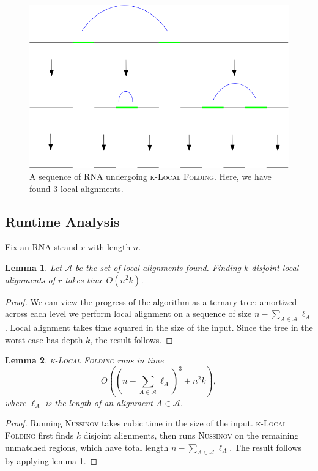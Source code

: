 \documentclass[11pt]{article}
\newcommand{\klf}{\textsc{k-Local Folding}\xspace}
\newcommand{\rf}{\textsc{Nussinov}\xspace}
\newtheorem{lemma}{Lemma}
\newcommand{\al}{\mathscr{A}}
\begin{document}
\begin{figure}[t]
\centering
\includegraphics[scale=0.4]{images/k_local_sequence.png}
\caption{A sequence of RNA undergoing \klf. Here, we have found 3 local alignments. }
\end{figure}

\subsection{Runtime Analysis}
Fix an RNA strand $r$ with length $n$. 
\begin{lemma}
Let $\al$ be the set of local alignments found. Finding $k$ disjoint local alignments of $r$ takes time $O(n^2 k)$. 
\end{lemma}
\begin{proof}
We can view the progress of the algorithm as a ternary tree: amortized across each level we perform local alignment on a sequence of size $n-\sum_{A\in\al}\ell_A$. Local alignment takes time squared in the size of the input. Since the tree in the worst case has depth $k$, the result follows. 
\end{proof}

\begin{lemma}
\klf runs in time
\[O\left(\left(n-\sum_{A\in\al}\ell_A\right)^3+n^2k\right),\] where $\ell_A$ is the length of an alignment $A\in\al$. 
\end{lemma}
\begin{proof}
Running \rf takes cubic time in the size of the input. \klf first finds $k$ disjoint alignments, then runs \rf on the remaining unmatched regions, which have total length $n-\sum_{A\in\al}\ell_A$.   The result follows by applying lemma 1. 
\end{proof}
\end{document}
